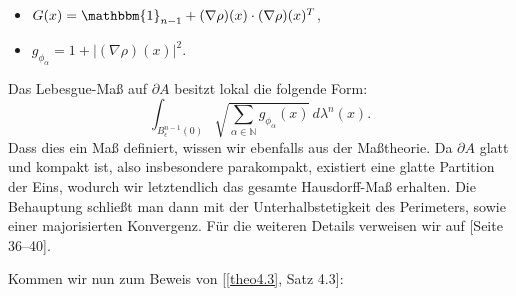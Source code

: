 \begin{itemize}
    \begin{itemize}
        \item \(G(x) = \mathbbm{1}_{n-1} + (\nabla \rho)(x) \cdot (\nabla \rho)(x)^T\),
        \item \(g_{\phi_{\alpha}} = 1 + |(\nabla \rho)(x)|^2\).
    \end{itemize}
    Das Lebesgue-Maß auf \(\partial A\) besitzt lokal die folgende Form:
    \begin{equation}
        \int_{B^{n-1}_{\epsilon}(0)} \sqrt{\sum_{\alpha \in \mathbb{N}} g_{\phi_{\alpha}}(x)} \, d\lambda^n(x).
    \end{equation}
    Dass dies ein Maß definiert, wissen wir ebenfalls aus der Maßtheorie. Da \(\partial A\) glatt und kompakt ist, also insbesondere parakompakt, existiert eine glatte Partition der Eins, wodurch wir letztendlich das gesamte Hausdorff-Maß erhalten. Die Behauptung schließt man dann mit der Unterhalbstetigkeit des Perimeters, sowie einer majorisierten Konvergenz.
    Für die weiteren Details verweisen wir auf \cite{LeoniGammaPhase}[Seite 36--40]. \QEDB 
\end{itemize}
Kommen wir nun zum Beweis von [\ref{theo4.3}, Satz 4.3]:\\
